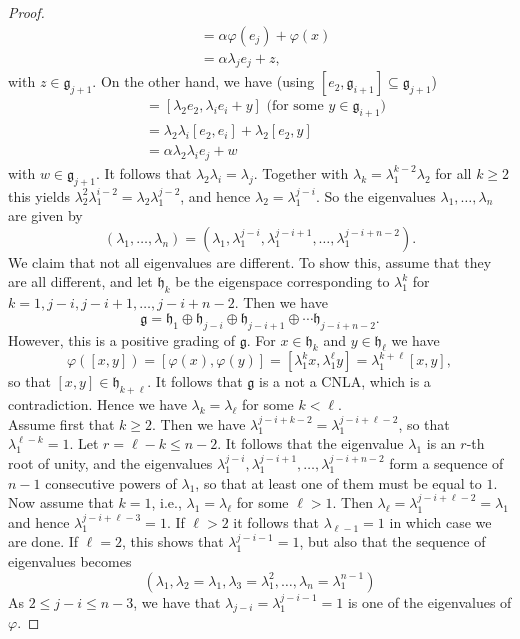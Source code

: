 \documentclass[12pt]{amsart}
\theoremstyle{definition}
\theoremstyle{remark}
\newcommand{\Lg}{\mathfrak{g}}
\newcommand{\Lh}{\mathfrak{h}}
\newcommand{\al}{\alpha}
\newcommand{\la}{\lambda}
\renewcommand{\phi}{\varphi}
\begin{document}
\begin{proof}
\begin{align*}
        & = \al\phi(e_j)+\phi(x) \\  
        & = \al\la_je_j+z,
\end{align*}
with $z\in \Lg_{j+1}$. 
On the other hand, we have (using $[e_2,\Lg_{i+1}]\subseteq \Lg_{j+1}$)
\begin{align*}
[\phi(e_2),\phi(e_i)] & = [\la_2 e_2,\la_ie_i+y] \mbox{ (for some $y \in \Lg_{i+1}$)}\\
                     & = \la_2\la_i[e_2,e_i]+ \la_2 [e_2,y] \\
                     & = \al\la_2\la_ie_j+w                         
\end{align*}
with $w\in \Lg_{j+1}$. It follows that $\la_2\la_i=\la_j$. Together with $\la_k=\la_1^{k-2}\la_2$ for all $k\geq 2$
this yields $\la_2^2\la_1^{i-2}=\la_2\la_1^{j-2}$, and hence $\la_2=\la_1^{j-i}$.
So the eigenvalues $\la_1,\ldots ,\la_n$ are given by
\[
(\la_1,\ldots ,\la_n)=(\la_1,\la_1^{j-i},\la_1^{j-i+1},\ldots ,\la_1^{j-i+n-2}).
\]
We claim that not all eigenvalues are different. To show this, assume that they are all different, and let
$\Lh_k$ be the eigenspace corresponding to $\la_1^k$ for $k=1,j-i,j-i+1,\ldots ,j-i+n-2$.
Then we have
\[
\Lg=\Lh_1\oplus \Lh_{j-i}\oplus \Lh_{j-i+1}\oplus \cdots \Lh_{j-i+n-2}.
\]
However, this is a positive grading of $\Lg$. For $x\in \Lh_k$ and $y\in \Lh_{\ell}$ we have
\[
\phi([x,y]) =[\phi(x),\phi(y)]=[\la_1^kx,\la_1^{\ell}y]=\la_1^{k+\ell}[x,y],
\]
so that $[x,y]\in \Lh_{k+\ell}$. It follows that $\Lg$ is a not a CNLA, which is a contradiction. Hence we have
$\la_k=\la_{\ell}$ for some $k<\ell$. \\
Assume first that $k\ge 2$. Then we have $\la_1^{j-i+k-2}=\la_1^{j-i+\ell-2}$,
so that $\la_1^{\ell-k}=1$. Let $r=\ell-k\le n-2$.
It follows that the eigenvalue $\la_1$ is an $r$-th root of unity, and the eigenvalues
$\la_1^{j-i},\la_1^{j-i+1},\ldots ,\la_1^{j-i+n-2}$
form a sequence of $n-1$ consecutive powers of $\la_1$, so that at least one of them must be equal to $1$. \\
Now assume that $k=1$, i.e., $\la_1=\la_{\ell}$ for some $\ell>1$. Then $\la_{\ell}=\la_1^{j-i+\ell-2}=\la_1$ and hence 
$\la_1^{j-i+\ell -3}=1$.
If $\ell >2 $ it follows that 
 $\la_{\ell-1}=1$ in which case we are done. If $\ell=2$, this shows that $\lambda_1^{j-i-1}=1$, but also that the sequence of eigenvalues becomes
 \[ (\la_1, \la_2=\la_1, \la_3= \la_1^2,\ldots , \la_n=\la_1^{n-1})\]
 As $2 \leq j-i\leq n-3$, we have that $\la_{j-i}= \la_1^{j-i-1}=1$ is one of the eigenvalues of $\varphi$.

\end{proof}
\end{document}
